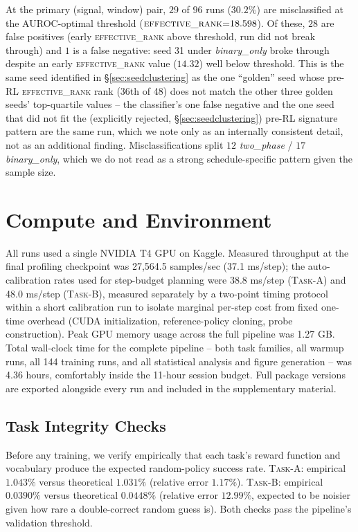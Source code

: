\documentclass{article}
\newcommand{\taskA}{\textsc{Task-A}}
\newcommand{\taskB}{\textsc{Task-B}}
\newcommand{\erank}{\textsc{effective\_rank}}
\begin{document}
At the primary (signal, window) pair, $29$ of $96$ runs ($30.2\%$) are
misclassified at the AUROC-optimal threshold ($\erank{=}18.598$). Of these,
$28$ are false positives (early \erank{} above threshold, run did not break
through) and $1$ is a false negative: seed 31 under \emph{binary\_only} broke
through despite an early \erank{} value ($14.32$) well below threshold. This
is the same seed identified in \S\ref{sec:seedclustering} as the one
``golden'' seed whose pre-RL \erank{} rank (36th of 48) does not match the
other three golden seeds' top-quartile values -- the classifier's one false
negative and the one seed that did not fit the (explicitly rejected,
\S\ref{sec:seedclustering}) pre-RL signature pattern are the same run, which
we note only as an internally consistent detail, not as an additional finding.
Misclassifications split $12$ \emph{two\_phase} / $17$ \emph{binary\_only},
which we do not read as a strong schedule-specific pattern given the sample
size.

\section{Compute and Environment}
\label{app:compute}

All runs used a single NVIDIA T4 GPU on Kaggle. Measured throughput at the
final profiling checkpoint was 27{,}564.5 samples/sec (37.1 ms/step); the
auto-calibration rates used for step-budget planning were 38.8 ms/step
(\taskA) and 48.0 ms/step (\taskB), measured separately by a two-point timing
protocol within a short calibration run to isolate marginal per-step cost from
fixed one-time overhead (CUDA initialization, reference-policy cloning, probe
construction). Peak GPU memory usage across the full pipeline was 1.27 GB.
Total wall-clock time for the complete pipeline -- both task families, all
warmup runs, all 144 training runs, and all statistical analysis and figure
generation -- was 4.36 hours, comfortably inside the 11-hour session budget.
Full package versions are exported alongside every run and included in the
supplementary material.

\subsection{Task Integrity Checks}
Before any training, we verify empirically that each task's reward function
and vocabulary produce the expected random-policy success rate.
\taskA{}: empirical $1.043\%$ versus theoretical $1.031\%$ (relative error
$1.17\%$). \taskB{}: empirical $0.0390\%$ versus theoretical $0.0448\%$
(relative error $12.99\%$, expected to be noisier given how rare a
double-correct random guess is). Both checks pass the pipeline's validation
threshold.
\end{document}
